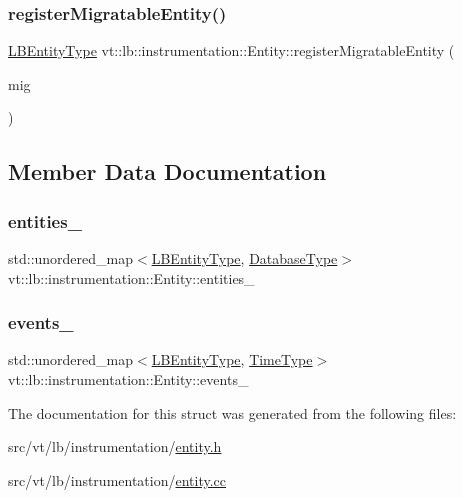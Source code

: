\subsubsection{\texorpdfstring{register\+Migratable\+Entity()}{registerMigratableEntity()}}
{\footnotesize\ttfamily \hyperlink{namespacevt_a92ec26fb6644cd0ba7eb0ee70c96bee5}{L\+B\+Entity\+Type} vt\+::lb\+::instrumentation\+::\+Entity\+::register\+Migratable\+Entity (\begin{DoxyParamCaption}\item[{\hyperlink{structvt_1_1lb_1_1instrumentation_1_1_entity_a40dd6e30c20027d66b9193323d9e0cb0}{Migratable\+Type} $\ast$}]{mig }\end{DoxyParamCaption})\hspace{0.3cm}{\ttfamily [static]}}



\subsection{Member Data Documentation}
\mbox{\label{structvt_1_1lb_1_1instrumentation_1_1_entity_acee0eaf80ba5f6fe27cf317080112250}} 
\subsubsection{\texorpdfstring{entities\+\_\+}{entities\_}}
{\footnotesize\ttfamily std\+::unordered\+\_\+map$<$\hyperlink{namespacevt_a92ec26fb6644cd0ba7eb0ee70c96bee5}{L\+B\+Entity\+Type}, \hyperlink{structvt_1_1lb_1_1instrumentation_1_1_entity_a2c8b6bfe6f30a4407a996aaae856b052}{Database\+Type}$>$ vt\+::lb\+::instrumentation\+::\+Entity\+::entities\+\_\+\hspace{0.3cm}{\ttfamily [static]}}

\mbox{\label{structvt_1_1lb_1_1instrumentation_1_1_entity_ae102f212f1b07d9864da90bb8aa95125}} 
\subsubsection{\texorpdfstring{events\+\_\+}{events\_}}
{\footnotesize\ttfamily std\+::unordered\+\_\+map$<$\hyperlink{namespacevt_a92ec26fb6644cd0ba7eb0ee70c96bee5}{L\+B\+Entity\+Type}, \hyperlink{namespacevt_a876a9d0cd5a952859c72de8a46881442}{Time\+Type}$>$ vt\+::lb\+::instrumentation\+::\+Entity\+::events\+\_\+\hspace{0.3cm}{\ttfamily [static]}}



The documentation for this struct was generated from the following files\+:\begin{DoxyCompactItemize}
\item 
src/vt/lb/instrumentation/\hyperlink{lb_2instrumentation_2entity_8h}{entity.\+h}\item 
src/vt/lb/instrumentation/\hyperlink{entity_8cc}{entity.\+cc}\end{DoxyCompactItemize}
